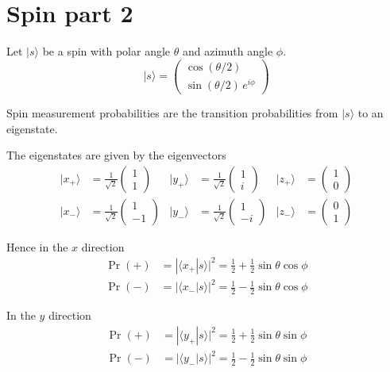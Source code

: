 

\section*{Spin part 2}

Let $|s\rangle$ be a spin with polar angle $\theta$ and azimuth angle $\phi$.
\begin{equation*}
|s\rangle=\begin{pmatrix}\cos(\theta/2)\\[1ex]\sin(\theta/2)\,e^{i\phi}\end{pmatrix}
\end{equation*}

Spin measurement probabilities are the transition probabilities from $|s\rangle$ to an eigenstate.

\bigskip
The eigenstates are given by the eigenvectors
\begin{align*}
|x_+\rangle&=\frac{1}{\sqrt2}\begin{pmatrix}1\\1\end{pmatrix}
&
|y_+\rangle&=\frac{1}{\sqrt2}\begin{pmatrix}1\\i\end{pmatrix}
&
|z_+\rangle&=\begin{pmatrix}1\\0\end{pmatrix}
\\[1ex]
|x_-\rangle&=\frac{1}{\sqrt2}\begin{pmatrix}1\\-1\end{pmatrix}
&
|y_-\rangle&=\frac{1}{\sqrt2}\begin{pmatrix}1\\-i\end{pmatrix}
&
|z_-\rangle&=\begin{pmatrix}0\\1\end{pmatrix}
\end{align*}

Hence in the $x$ direction
\begin{align*}
\Pr(+)
&=|\langle x_+|s\rangle|^2
=\tfrac{1}{2}+\tfrac{1}{2}\sin\theta\cos\phi
\\[1ex]
\Pr(-)
&=|\langle x_-|s\rangle|^2
=\tfrac{1}{2}-\tfrac{1}{2}\sin\theta\cos\phi
\end{align*}

In the $y$ direction
\begin{align*}
\Pr(+)
&=|\langle y_+|s\rangle|^2
=\tfrac{1}{2}+\tfrac{1}{2}\sin\theta\sin\phi
\\[1ex]
\Pr(-)
&=|\langle y_-|s\rangle|^2
=\tfrac{1}{2}-\tfrac{1}{2}\sin\theta\sin\phi
\end{align*}

